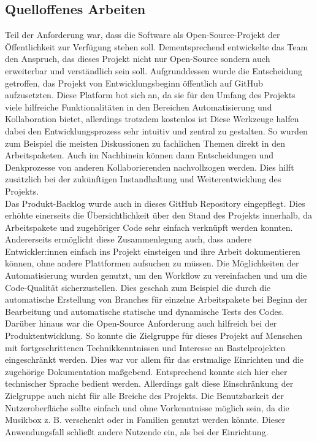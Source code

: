 \documentclass[10pt, a4paper]{article}
\begin{document}
\begin{onehalfspace}
  \subsection{Quelloffenes Arbeiten}
  Teil der Anforderung war, dass die Software als Open-Source-Projekt der Öffentlichkeit zur Verfügung stehen soll.
  Dementsprechend entwickelte das Team den Anspruch, das dieses Projekt nicht nur Open-Source sondern auch erweiterbar und verständlich sein soll.
  Aufgrunddessen wurde die Entscheidung getroffen, das Projekt von Entwicklungsbeginn öffentlich auf GitHub aufzusetzten.
  Diese Platform bot sich an, da sie für den Umfang des Projekts viele hilfreiche Funktionalitäten in den Bereichen Automatisierung und Kollaboration bietet, allerdings trotzdem kostenlos ist
  Diese Werkzeuge halfen dabei den Entwicklungsprozess sehr intuitiv und zentral zu gestalten.
  So wurden zum Beispiel die meisten Diskussionen zu fachlichen Themen direkt in den Arbeitspaketen.
  Auch im Nachhinein können dann Entscheidungen und Denkprozesse von anderen Kollaborierenden nachvollzogen werden.
  Dies hilft zusätzlich bei der zukünftigen Instandhaltung und Weiterentwicklung des Projekts.
  \\
  Das Produkt-Backlog wurde auch in dieses GitHub Repository eingepflegt.
  Dies erhöhte einerseits die Übersichtlichkeit über den Stand des Projekts innerhalb, da Arbeitspakete und zugehöriger Code sehr einfach verknüpft werden konnten.
  Andererseits ermöglicht diese Zusammenlegung auch, dass andere Entwickler:innen einfach ins Projekt einsteigen und ihre Arbeit dokumentieren können, ohne andere Plattformen aufsuchen zu müssen.
  Die Möglichkeiten der Automatisierung wurden genutzt, um den Workflow zu vereinfachen und um die Code-Qualität sicherzustellen.
  Dies geschah zum Beispiel die durch die automatische Erstellung von Branches für einzelne Arbeitspakete bei Beginn der Bearbeitung und automatische statische und dynamische Tests des Codes.
  \\
  Darüber hinaus war die Open-Source Anforderung auch hilfreich bei der Produktentwicklung.
  So konnte die Zielgruppe für dieses Projekt auf Menschen mit fortgeschrittenen Technikkenntnissen und Interesse an Bastelprojekten eingeschränkt werden.
  Dies war vor allem für das erstmalige Einrichten und die zugehörige Dokumentation maßgebend.
  Entsprechend konnte sich hier eher technischer Sprache bedient werden.
  Allerdings galt diese Einschränkung der Zielgruppe auch nicht für alle Breiche des Projekts.
  Die Benutzbarkeit der Nutzeroberfläche sollte einfach und ohne Vorkenntnisse möglich sein, da die Musikbox z. B. verschenkt oder in Familien genutzt werden könnte.
  Dieser Anwendungsfall schließt andere Nutzende ein, als bei der Einrichtung.



\end{onehalfspace}
\end{document}
